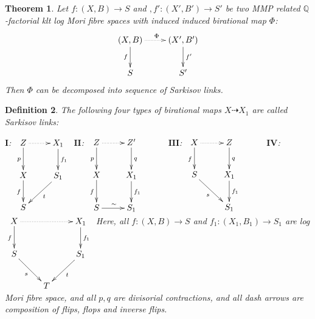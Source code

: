 \documentclass{article}
\newtheorem{defn}{Definition}[subsection]
\newtheorem{thm}[defn]{Theorem}
\newtheorem{rmk}[defn]{Remark}
\begin{document}
\begin{thm}
  Let $ f:(X,B)\to S$ and $,f':(X',B')\to S' $ be two MMP related $ \mathbb{Q} $-factorial klt log Mori fibre spaces with induced induced  birational map $\Phi$:
  \[ \xymatrix{
    (X,B)\ar[d]_f\ar@{.>}[r]^\Phi&(X',B')\ar[d]^{f'}\\
    S&S'} \]
  Then $ \Phi  $ can be decomposed into sequence of Sarkisov links.
  \end{thm}

\begin{defn}
  The following four types of  birational maps $X\dashrightarrow X_1$ are called Sarkisov links: 

  $\textbf{I}$:
  $\xymatrix{
    Z\ar[d]_p\ar@{.>}[r]&X_1\ar[d]^{f_1}\\
    X\ar[d]_f&S_1\ar[dl]^{t}\\
  S &}$
  $\textbf{II}$:
  $\xymatrix{
    Z\ar[d]_p\ar@{.>}[r]&Z'\ar[d]^{q}&\\
    X\ar[d]_{f}&X_1\ar[d]^{f_1}\\
    S\ar[r]^{\sim}&S_1}$
  $\textbf{III}$:
  $
  \xymatrix{
    X\ar@{.>}[r]\ar[d]_f& Z\ar[d]^q& \\
    S\ar[rd]_{s}         & X_{1}\ar[d]^{f_{1}}&\\
    &S_{1}
  }
  $
  $\textbf{IV}$:
  $\xymatrix{
    X\ar[d]_f\ar@{.>}[rr]&&X_1\ar[d]^{f_1}\\
    S\ar[dr]_{s}&&S_1\ar[dl]^{t}\\
    &T &}$
  Here, all $ f:(X,B)\to S $ and $ f_1:(X_1,B_1)\to S_1 $ are log Mori fibre space, and all $ p,q $ are divisorial contractions, and all dash arrows are composition of flips, flops and inverse flips. 
\end{defn}
\end{document}
